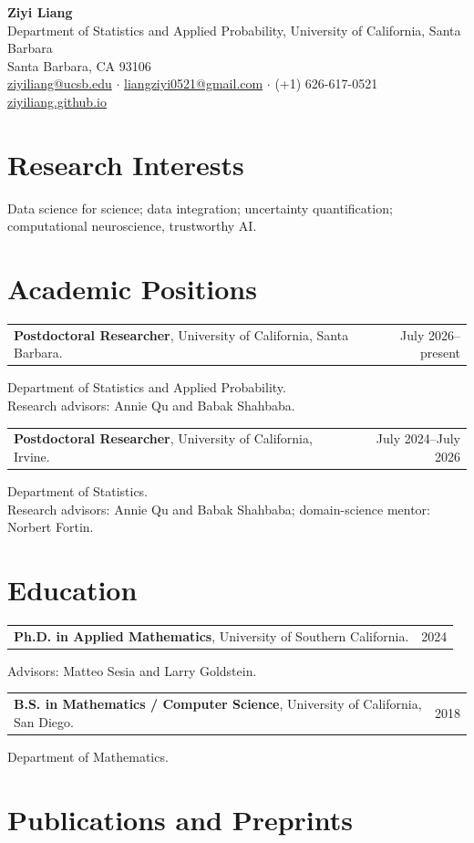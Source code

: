\documentclass[11pt]{article}
\makeatletter
\newcommand{\cvrow}[2]{%
  \begin{tabularx}{\textwidth}{@{}Xr@{}}#1 & #2\end{tabularx}}
\makeatother
\begin{document}
\begin{center}
  {\Huge\bfseries Ziyi Liang}\\[6pt]
  Department of Statistics and Applied Probability, University of California, Santa Barbara\\
  Santa Barbara, CA 93106\\[3pt]
  \href{mailto:ziyiliang@ucsb.edu}{ziyiliang@ucsb.edu} \enspace$\cdot$\enspace
  \href{mailto:liangziyi0521@gmail.com}{liangziyi0521@gmail.com} \enspace$\cdot$\enspace
  (+1) 626-617-0521\\
  \href{https://ziyiliang.github.io/}{ziyiliang.github.io}
\end{center}

\section{Research Interests}
Data science for science; data integration; uncertainty quantification; computational neuroscience, trustworthy AI.

\section{Academic Positions}

\cvrow{\textbf{Postdoctoral Researcher}, University of California, Santa Barbara.}{July 2026--present}
Department of Statistics and Applied Probability. \\
Research advisors: Annie Qu and Babak Shahbaba.

\vspace{4pt}
\cvrow{\textbf{Postdoctoral Researcher}, University of California, Irvine.}{July 2024--July 2026}
Department of Statistics. \\
Research advisors: Annie Qu and Babak Shahbaba; domain-science mentor: Norbert Fortin.

\section{Education}

\cvrow{\textbf{Ph.D. in Applied Mathematics}, University of Southern California.}{2024}
Advisors: Matteo Sesia and Larry Goldstein.

\vspace{4pt}
\cvrow{\textbf{B.S. in Mathematics / Computer Science}, University of California, San Diego.}{2018}
Department of Mathematics.

\section{Publications and Preprints}
\end{document}
